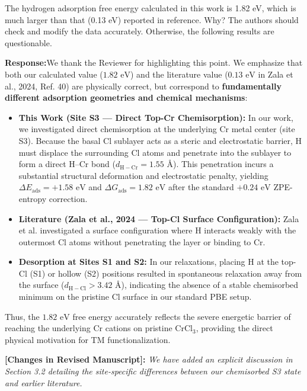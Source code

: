\documentclass[11pt, sans, a4paper]{moderncv}
\newcommand{\response}{\vspace{0.4em}\noindent\textbf{\color{actionblue}Response:}\hspace{0.5em}}
\newcommand{\manuscriptchange}[1]{\vspace{0.3em}\noindent\textbf{\color{acsblue}[Changes in Revised Manuscript]:} \textit{#1}\vspace{0.4em}}
\begin{document}
\begin{reviewercomment}
The hydrogen adsorption free energy calculated in this work is 1.82 eV, which is much larger than that (0.13 eV) reported in reference. Why? The authors should check and modify the data accurately. Otherwise, the following results are questionable.
\end{reviewercomment}

\response We thank the Reviewer for highlighting this point. We emphasize that both our calculated value ($1.82\text{ eV}$) and the literature value ($0.13\text{ eV}$ in Zala et al., 2024, Ref. 40) are physically correct, but correspond to \textbf{fundamentally different adsorption geometries and chemical mechanisms}:
\begin{itemize}[leftmargin=1.5em, itemsep=0.2em]
    \item \textbf{This Work (Site S3 --- Direct Top-Cr Chemisorption):} In our work, we investigated direct chemisorption at the underlying Cr metal center (site S3). Because the basal Cl sublayer acts as a steric and electrostatic barrier, H must displace the surrounding Cl atoms and penetrate into the sublayer to form a direct $\text{H--Cr}$ bond ($d_{\mathrm{H-Cr}} = 1.55\text{ \AA}$). This penetration incurs a substantial structural deformation and electrostatic penalty, yielding $\Delta E_{\mathrm{ads}} = +1.58\text{ eV}$ and $\Delta G_{\mathrm{ads}} = 1.82\text{ eV}$ after the standard $+0.24\text{ eV}$ ZPE-entropy correction.
    \item \textbf{Literature (Zala et al., 2024 --- Top-Cl Surface Configuration):} Zala et al. investigated a surface configuration where H interacts weakly with the outermost Cl atoms without penetrating the layer or binding to Cr.
    \item \textbf{Desorption at Sites S1 and S2:} In our relaxations, placing H at the top-Cl (S1) or hollow (S2) positions resulted in spontaneous relaxation away from the surface ($d_{\mathrm{H-Cl}} > 3.42\text{ \AA}$), indicating the absence of a stable chemisorbed minimum on the pristine Cl surface in our standard PBE setup.
\end{itemize}
Thus, the $1.82\text{ eV}$ free energy accurately reflects the severe energetic barrier of reaching the underlying Cr cations on pristine $\text{CrCl}_3$, providing the direct physical motivation for TM functionalization.

\manuscriptchange{We have added an explicit discussion in Section 3.2 detailing the site-specific differences between our chemisorbed S3 state and earlier literature.}
\end{document}
